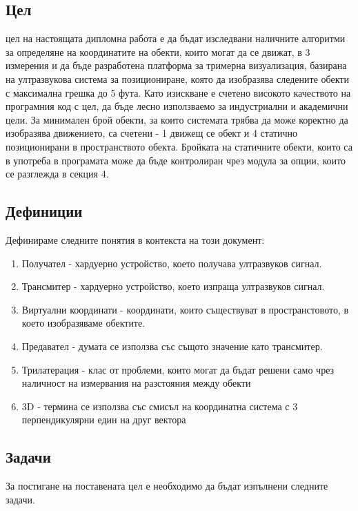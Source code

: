 \subsection{Цел}
 цел на настоящата дипломна работа е да бъдат изследвани наличните алгоритми за определяне на координатите на обекти, които могат да се движат, в 3 измерения и да бъде разработена платформа за тримерна визуализация, базирана на ултразвукова система за позициониране, която да изобразява следените обекти с максимална грешка до 5 фута. Като изискване е счетено високото качеството на програмния код с цел, да бъде лесно използваемо за индустриални и академични цели. За минимален брой обекти, за които системата трябва да може коректно да изобразява движението, са счетени - 1 движещ се обект и 4 статично позиционирани в пространството обекта. Бройката на статичните обекти, които са в употреба в програмата може да бъде контролиран чрез модула за опции, които се разглежда в секция 4.

\subsection{Дефиниции}
Дефинираме следните понятия в контекста на този документ:
\begin{enumerate}
    \item Получател - хардуерно устройство, което получава ултразвуков сигнал.
    \item Трансмитер - хардуерно устройство, което изпраща ултразвуков сигнал.
    \item Виртуални координати - координати, които съществуват в пространстовото, в което изобразяваме обектите.
    \item Предавател - думата се използва със същото значение като трансмитер.
    \item Трилатерация - клас от проблеми, които могат да бъдат решени само чрез наличност на измервания на разстояния между обекти \cite{murphy}
    \item 3D - термина се използва със смисъл на координатна система с 3 перпендикулярни един на друг вектора \cite{3d}
\end{enumerate}

\subsection{Задачи}
За постигане на поставената цел е необходимо да бъдат изпълнени следните задачи.


